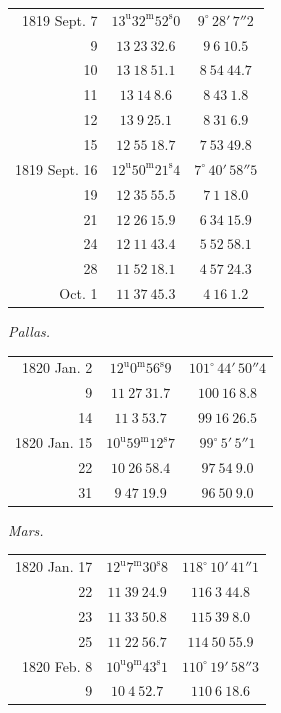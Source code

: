 \begin{center}
\begin{tabular}{r|c|c}
1819 Sept. 7 & $13^{\mathrm u}32^{\mathrm m}52^{\mathrm s}0$ & $9^\circ\,28'\,7''2$ \\
9 & $13\ 23\ 32.6$ & $9\ 6\ 10.5$ \\
10 & $13\ 18\ 51.1$ & $8\ 54\ 44.7$ \\
11 & $13\ 14\ 8.6$ & $8\ 43\ 1.8$ \\
12 & $13\ 9\ 25.1$ & $8\ 31\ 6.9$ \\
15 & $12\ 55\ 18.7$ & $7\ 53\ 49.8$ \\
\hline
1819 Sept. 16 & $12^{\mathrm u}50^{\mathrm m}21^{\mathrm s}4$ & $7^\circ\,40'\,58''5$ \\
19 & $12\ 35\ 55.5$ & $7\ 1\ 18.0$ \\
21 & $12\ 26\ 15.9$ & $6\ 34\ 15.9$ \\
24 & $12\ 11\ 43.4$ & $5\ 52\ 58.1$ \\
28 & $11\ 52\ 18.1$ & $4\ 57\ 24.3$ \\
Oct. 1 & $11\ 37\ 45.3$ & $4\ 16\ 1.2$ \\
\end{tabular}
\end{center}

\begin{center}
\textit{Pallas.}
\end{center}

\begin{center}
\begin{tabular}{r|c|c}
1820 Jan. 2 & $12^{\mathrm u}0^{\mathrm m}56^{\mathrm s}9$ & $101^\circ\,44'\,50''4$ \\
9 & $11\ 27\ 31.7$ & $100\ 16\ 8.8$ \\
14 & $11\ 3\ 53.7$ & $99\ 16\ 26.5$ \\
\hline
1820 Jan. 15 & $10^{\mathrm u}59^{\mathrm m}12^{\mathrm s}7$ & $99^\circ\,5'\,5''1$ \\
22 & $10\ 26\ 58.4$ & $97\ 54\ 9.0$ \\
31 & $9\ 47\ 19.9$ & $96\ 50\ 9.0$ \\
\end{tabular}
\end{center}

\begin{center}
\textit{Mars.}
\end{center}

\begin{center}
\begin{tabular}{r|c|c}
1820 Jan. 17 & $12^{\mathrm u}7^{\mathrm m}30^{\mathrm s}8$ & $118^\circ\,10'\,41''1$ \\
22 & $11\ 39\ 24.9$ & $116\ 3\ 44.8$ \\
23 & $11\ 33\ 50.8$ & $115\ 39\ 8.0$ \\
25 & $11\ 22\ 56.7$ & $114\ 50\ 55.9$ \\
\hline
1820 Feb. 8 & $10^{\mathrm u}9^{\mathrm m}43^{\mathrm s}1$ & $110^\circ\,19'\,58''3$ \\
9 & $10\ 4\ 52.7$ & $110\ 6\ 18.6$ \\
\end{tabular}
\end{center}

